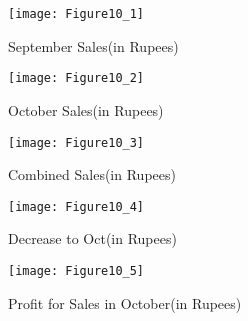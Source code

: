 \documentclass[journal,12pt,twocolumn]{IEEEtran}
\begin{document}
\begin{figure}[!ht]
\centering
\texttt{[image: Figure10\_1]}
\caption{September Sales(in Rupees)}
\label{fig:SeptSales}	
\end{figure}

\begin{figure}[!ht]
\centering
\texttt{[image: Figure10\_2]}
\caption{October Sales(in Rupees)}
\label{fig:OcttSales}	
\end{figure}

\begin{figure}[!ht]
\centering
\texttt{[image: Figure10\_3]}
\caption{Combined Sales(in Rupees)}
\label{fig:Combined}	
\end{figure}

\begin{figure}[!ht]
\centering
\texttt{[image: Figure10\_4]}
\caption{Decrease  to Oct(in Rupees)}
\label{fig:Decrease}	
\end{figure}

\begin{figure}[!ht]
\centering
\texttt{[image: Figure10\_5]}
\caption{Profit for Sales in October(in Rupees)}
\label{fig:Profit}	
\end{figure}
\end{document}
